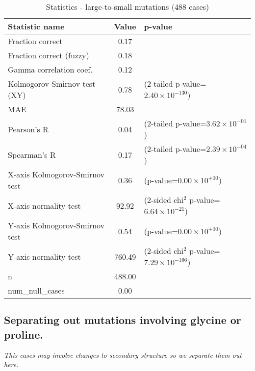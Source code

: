\documentclass[10pt, letterpaper, oneside, titlepage, landscape]{scrreprt}
\begin{document}
\begin{table}[H]\begin{center}
\begin{tabular}{ l S[table-format=3.2] l}
Statistic name & {Value} & p-value\\
\hline
Fraction correct & 0.17 & \\
Fraction correct (fuzzy) & 0.18 & \\
Gamma correlation coef. & 0.12 & \\
Kolmogorov-Smirnov test (XY) & 0.78 & (2-tailed p-value=$2.40\times10^{-130}$)\\
MAE & 78.03 & \\
Pearson's R & 0.04 & (2-tailed p-value=$3.62\times10^{-01}$)\\
Spearman's R & 0.17 & (2-tailed p-value=$2.39\times10^{-04}$)\\
X-axis Kolmogorov-Smirnov test & 0.36 & (p-value=$0.00\times10^{+00}$)\\
X-axis normality test & 92.92 & (2-sided chi$^{2}$ p-value=$6.64\times10^{-21}$)\\
Y-axis Kolmogorov-Smirnov test & 0.54 & (p-value=$0.00\times10^{+00}$)\\
Y-axis normality test & 760.49 & (2-sided chi$^{2}$ p-value=$7.29\times10^{-166}$)\\
n & 488.00 & \\
num\_null\_cases & 0.00 & \\
\end{tabular}
\caption{Statistics - large-to-small mutations (488 cases)}
\end{center}\end{table}


\subsection{Separating out mutations involving glycine or proline.}
\textit{This cases may involve changes to secondary structure so we separate them out here.}
\end{document}
